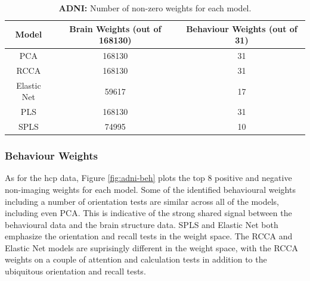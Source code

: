 \begin{table}
    \centering
    \caption{\textbf{ADNI:} Number of non-zero \gls{weights} for each model.}
    \begin{tabular}{|c|c|c|}
        \hline
        Model       & Brain Weights (out of 168130) & Behaviour Weights (out of 31) \\
        \hline
        PCA         & 168130        & 31                \\
        RCCA        & 168130        & 31                \\
        Elastic Net & 59617         & 17                \\
        PLS         & 168130        & 31                \\
        SPLS        & 74995         & 10                \\
        \hline
    \end{tabular}\label{tab:brain-behaviour-weights-adni}
\end{table}

\subsubsection{Behaviour Weights}

As for the \acrshort{hcp} data, Figure \ref{fig:adni-beh} plots the top 8 positive and negative non-imaging \gls{weights} for each model.
Some of the identified behavioural \gls{weights} including a number of orientation tests are similar across all of the models, including even PCA.
This is indicative of the strong shared signal between the behavioural data and the brain structure data.
SPLS and Elastic Net both emphasize the orientation and recall tests in the weight space.
The RCCA and Elastic Net models are suprisingly different in the weight space, with the RCCA \gls{weights} on a couple of attention and calculation tests in addition to the ubiquitous orientation and recall tests.

